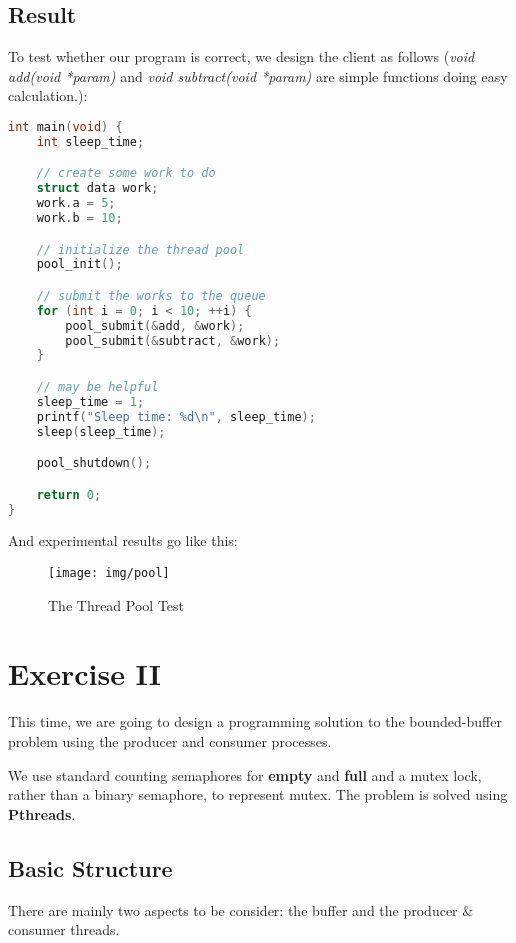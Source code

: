 \documentclass{article}
\begin{document}
\subsection*{Result}
To test whether our program is correct, we design the client as follows (\textit{void add(void *param)} and \textit{void subtract(void *param)} are simple functions doing easy calculation.):

\begin{lstlisting}[language=c, caption={client.c}]
int main(void) {
    int sleep_time;

    // create some work to do
    struct data work;
    work.a = 5;
    work.b = 10;

    // initialize the thread pool
    pool_init();

    // submit the works to the queue
    for (int i = 0; i < 10; ++i) {
        pool_submit(&add, &work);
        pool_submit(&subtract, &work);
    }

    // may be helpful 
    sleep_time = 1;
    printf("Sleep time: %d\n", sleep_time);
    sleep(sleep_time);

    pool_shutdown();

    return 0;
}
\end{lstlisting}

And experimental results go like this:

\begin{figure}[h]
    \centering
    
    \texttt{[image: img/pool]}
    \caption{The Thread Pool Test}
    \label{}
\end{figure}

\section*{Exercise II}
This time, we are going to design a programming solution to the bounded-buffer problem using the producer and consumer processes.

We use standard counting semaphores
for \textbf{empty} and \textbf{full} and a mutex lock, rather than a binary semaphore, to
represent mutex. The problem is solved using \textbf{Pthreads}.

\subsection*{Basic Structure}
There are mainly two aspects to be consider: the buffer and the producer \& consumer threads.
\end{document}

